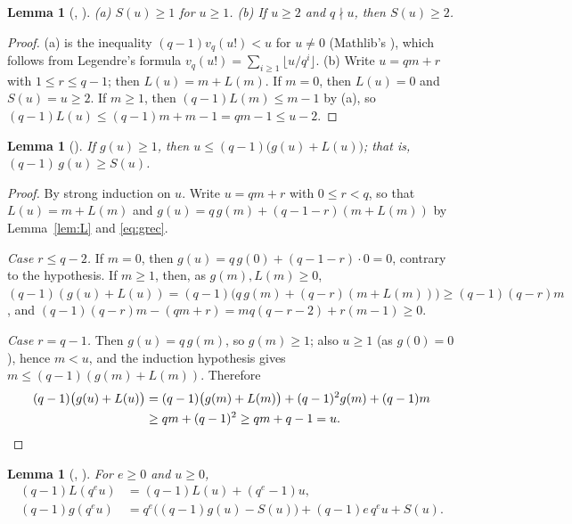 \documentclass[11pt]{amsart}
\theoremstyle{plain}
\newtheorem{lemma}[theorem]{Lemma}
\theoremstyle{definition}
\begin{document}
\begin{lemma}[, ]\label{lem:S}
\textup{(a)} $S(u)\ge1$ for $u\ge1$. \textup{(b)} If $u\ge2$ and $q\nmid u$, then $S(u)\ge2$.
\end{lemma}

\begin{proof}
(a) is the inequality $(q-1)v_q(u!)<u$ for $u\ne0$ (Mathlib's ), which follows from Legendre's formula $v_q(u!)=\sum_{i\ge1}\lfloor u/q^i\rfloor$.
(b) Write $u=qm+r$ with $1\le r\le q-1$; then $L(u)=m+L(m)$. If $m=0$, then $L(u)=0$ and $S(u)=u\ge2$. If $m\ge1$, then $(q-1)L(m)\le m-1$ by (a), so $(q-1)L(u)\le(q-1)m+m-1=qm-1\le u-2$.
\end{proof}

\begin{lemma}[]\label{lem:key}
If $g(u)\ge1$, then $u\le(q-1)\bigl(g(u)+L(u)\bigr)$; that is, $(q-1)\,g(u)\ge S(u)$.
\end{lemma}

\begin{proof}
By strong induction on $u$. Write $u=qm+r$ with $0\le r<q$, so that $L(u)=m+L(m)$ and $g(u)=q\,g(m)+(q-1-r)(m+L(m))$ by Lemma~\ref{lem:L} and \eqref{eq:grec}.

\emph{Case $r\le q-2$.} If $m=0$, then $g(u)=q\,g(0)+(q-1-r)\cdot0=0$, contrary to the hypothesis. If $m\ge1$, then, as $g(m),L(m)\ge0$, $(q-1)(g(u)+L(u))=(q-1)\bigl(q\,g(m)+(q-r)(m+L(m))\bigr)\ge(q-1)(q-r)m$, and $(q-1)(q-r)m-(qm+r)=mq(q-r-2)+r(m-1)\ge0$.

\emph{Case $r=q-1$.} Then $g(u)=q\,g(m)$, so $g(m)\ge1$; also $u\ge1$ (as $g(0)=0$), hence $m<u$, and the induction hypothesis gives $m\le(q-1)(g(m)+L(m))$. Therefore
\begin{align*}
  (q-1)\bigl(g(u)+L(u)\bigr)&=(q-1)\bigl(g(m)+L(m)\bigr)+(q-1)^2g(m)+(q-1)m\\
  &\ge qm+(q-1)^2\ge qm+q-1=u. \qedhere
\end{align*}
\end{proof}

\begin{lemma}[, ]\label{lem:pow}
For $e\ge0$ and $u\ge0$,
\begin{align*}
  (q-1)L(q^eu)&=(q-1)L(u)+(q^e-1)u,\\
  (q-1)g(q^eu)&=q^e\bigl((q-1)g(u)-S(u)\bigr)+(q-1)e\,q^eu+S(u).
\end{align*}
\end{lemma}
\end{document}
